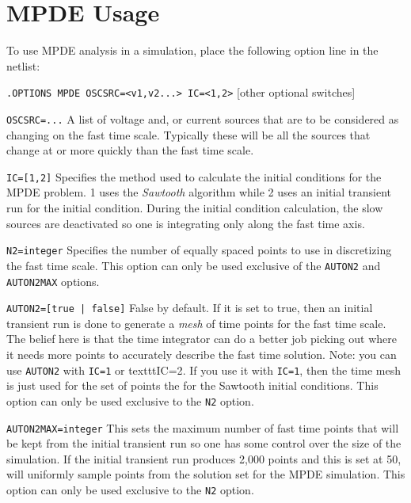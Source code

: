 \section{MPDE Usage}
\label{MPDE_Usage}

To use MPDE analysis in a simulation, place the following option line in the 
netlist:

\noindent\texttt{.OPTIONS MPDE OSCSRC=<v1,v2...> IC=<1,2>} [other optional switches]

\begin{XyceItemize}

\item \texttt{OSCSRC=...} A list of voltage and, or current sources that are 
to be considered as changing on the fast time scale.  Typically these will 
be all the sources that change at or more quickly than the fast time scale.

\item \texttt{IC=[1,2]} Specifies the method used to calculate the
initial conditions for the MPDE problem.  1 uses the {\em Sawtooth}
algorithm while 2 uses an initial transient run for the initial
condition.  During the initial condition calculation, the slow sources
are deactivated so one is integrating only along the fast time axis.

\item \texttt{N2=integer} Specifies the number of equally spaced points 
to use in discretizing the fast time scale.  This option can only be used
exclusive of the \texttt{AUTON2} and \texttt{AUTON2MAX} options.

\item \texttt{AUTON2=[true | false]}  False by default.  If it is set to
true, then an initial transient run is done to generate a {\em mesh} of
time points for the fast time scale.  The belief here is that the time
integrator can do a better job picking out where it needs more points to
accurately describe the fast time solution.   Note: you can use
\texttt{AUTON2} with \texttt{IC=1} or texttt{IC=2}.  If you use it with
\texttt{IC=1}, then the time mesh is just used for the set of points the
for the Sawtooth initial conditions.  This option can only be used exclusive 
to the \texttt{N2} option.

\item \texttt{AUTON2MAX=integer}  This sets the maximum number of fast
time points that will be kept from the initial transient run so one has
some control over the size of the simulation.  If the initial transient
run produces 2,000 points and this is set at 50, \Xyce{} will uniformly
sample points from the solution set for the MPDE simulation. This option
can only be used exclusive to the \texttt{N2} option.


\end{XyceItemize}
